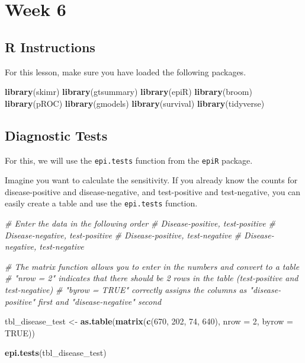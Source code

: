 \documentclass[]{book}
\newenvironment{Shaded}{\begin{snugshade}}{\end{snugshade}}
\newcommand{\CommentTok}[1]{\textcolor[rgb]{0.56,0.35,0.01}{\textit{#1}}}
\newcommand{\DataTypeTok}[1]{\textcolor[rgb]{0.13,0.29,0.53}{#1}}
\newcommand{\DecValTok}[1]{\textcolor[rgb]{0.00,0.00,0.81}{#1}}
\newcommand{\KeywordTok}[1]{\textcolor[rgb]{0.13,0.29,0.53}{\textbf{#1}}}
\newcommand{\NormalTok}[1]{#1}
\newcommand{\OtherTok}[1]{\textcolor[rgb]{0.56,0.35,0.01}{#1}}
\newcommand{\StringTok}[1]{\textcolor[rgb]{0.31,0.60,0.02}{#1}}
\begin{document}
\hypertarget{week-6}{%
\chapter{Week 6}\label{week-6}}

\hypertarget{r-instructions-5}{%
\section{R Instructions}\label{r-instructions-5}}

For this lesson, make sure you have loaded the following packages.

\begin{Shaded}
\begin{Highlighting}[]
\KeywordTok{library}\NormalTok{(skimr)}
\KeywordTok{library}\NormalTok{(gtsummary)}
\KeywordTok{library}\NormalTok{(epiR)}
\KeywordTok{library}\NormalTok{(broom)}
\KeywordTok{library}\NormalTok{(pROC)}
\KeywordTok{library}\NormalTok{(gmodels)}
\KeywordTok{library}\NormalTok{(survival)}
\KeywordTok{library}\NormalTok{(tidyverse)}
\end{Highlighting}
\end{Shaded}

\hypertarget{diagnostic-tests}{%
\section{Diagnostic Tests}\label{diagnostic-tests}}

For this, we will use the \texttt{epi.tests} function from the
\texttt{epiR} package.

Imagine you want to calculate the sensitivity. If you already know the
counts for disease-positive and disease-negative, and test-positive and
test-negative, you can easily create a table and use the
\texttt{epi.tests} function.

\begin{Shaded}
\begin{Highlighting}[]
\CommentTok{# Enter the data in the following order}
  \CommentTok{# Disease-positive, test-positive}
  \CommentTok{# Disease-negative, test-positive}
  \CommentTok{# Disease-positive, test-negative}
  \CommentTok{# Disease-negative, test-negative}

\CommentTok{# The matrix function allows you to enter in the numbers and convert to a table}
\CommentTok{# "nrow = 2" indicates that there should be 2 rows in the table (test-positive and test-negative)}
\CommentTok{# "byrow = TRUE" correctly assigns the columns as "disease-positive" first and "disease-negative" second}

\NormalTok{tbl_disease_test <-}
\StringTok{  }\KeywordTok{as.table}\NormalTok{(}\KeywordTok{matrix}\NormalTok{(}\KeywordTok{c}\NormalTok{(}\DecValTok{670}\NormalTok{, }\DecValTok{202}\NormalTok{, }\DecValTok{74}\NormalTok{, }\DecValTok{640}\NormalTok{),}
                  \DataTypeTok{nrow =} \DecValTok{2}\NormalTok{, }\DataTypeTok{byrow =} \OtherTok{TRUE}\NormalTok{))}

\KeywordTok{epi.tests}\NormalTok{(tbl_disease_test)}
\end{Highlighting}
\end{Shaded}
\end{document}

